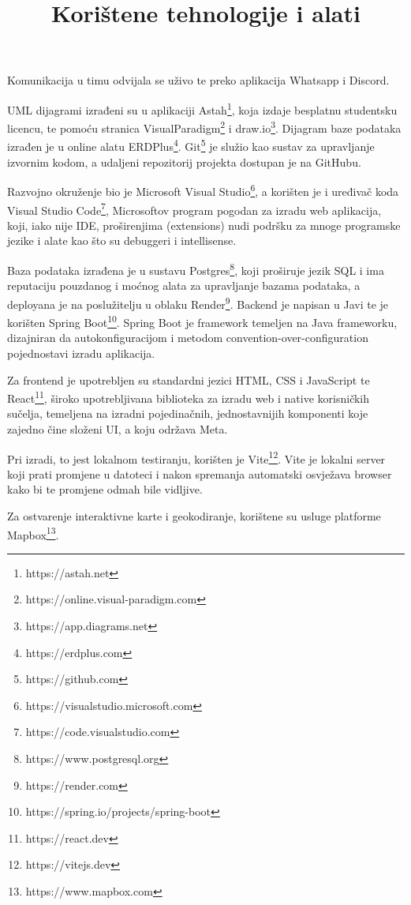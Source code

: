 \documentclass[12pt]{article}
\title{Korištene tehnologije i alati}
\begin{document}
\maketitle

Komunikacija u timu odvijala se uživo te preko aplikacija Whatsapp i Discord.

UML dijagrami izrađeni su u aplikaciji Astah\footnote{https://astah.net}, koja izdaje besplatnu studentsku licencu, te pomoću stranica VisualParadigm\footnote{https://online.visual-paradigm.com} i draw.io\footnote{https://app.diagrams.net}. Dijagram baze podataka izrađen je u online alatu ERDPlus\footnote{https://erdplus.com}.
Git\footnote{https://github.com} je služio kao sustav za upravljanje izvornim kodom, a udaljeni repozitorij projekta dostupan je na GitHubu.

Razvojno okruženje bio je Microsoft Visual Studio\footnote{https://visualstudio.microsoft.com}, a korišten je i uređivač koda Visual Studio Code\footnote{https://code.visualstudio.com}, Microsoftov program pogodan za izradu web aplikacija, koji, iako nije IDE, proširenjima (extensions) nudi podršku za mnoge programske jezike i alate kao što su debuggeri i intellisense.

Baza podataka izrađena je u sustavu Postgres\footnote{https://www.postgresql.org}, koji proširuje jezik SQL i ima reputaciju pouzdanog i moćnog alata za upravljanje bazama podataka, a deployana je na poslužitelju u oblaku Render\footnote{https://render.com}. 
Backend je napisan u Javi te je korišten Spring Boot\footnote{https://spring.io/projects/spring-boot}. Spring Boot je framework temeljen na Java frameworku, dizajniran da autokonfiguracijom i metodom convention-over-configuration pojednostavi izradu aplikacija. 

Za frontend je upotrebljen su standardni jezici HTML, CSS i JavaScript te React\footnote{https://react.dev}, široko upotrebljivana biblioteka za izradu web i native korisničkih sučelja, temeljena na izradni pojedinačnih, jednostavnijih komponenti koje zajedno čine složeni UI, a koju održava Meta. 

Pri izradi, to jest lokalnom testiranju, korišten je Vite\footnote{https://vitejs.dev}. Vite je lokalni server koji prati promjene u datoteci i nakon spremanja automatski osvježava browser kako bi te promjene odmah bile vidljive.

Za ostvarenje interaktivne karte i geokodiranje, korištene su usluge platforme Mapbox\footnote{https://www.mapbox.com}.
\end{document}

